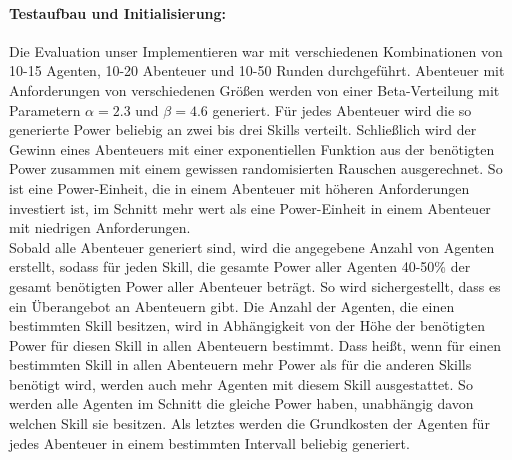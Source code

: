 \documentclass[fleqn,10pt]{SelfArx} %
\begin{document}
\paragraph{Testaufbau und Initialisierung:}
Die Evaluation unser Implementieren war mit verschiedenen Kombinationen von 10-15 Agenten, 10-20 Abenteuer und 10-50 Runden durchgeführt. Abenteuer mit Anforderungen von verschiedenen Größen werden von einer Beta-Verteilung mit Parametern $\alpha=2.3$ und $\beta=4.6$ generiert. Für jedes Abenteuer wird die so generierte Power beliebig an zwei bis drei Skills verteilt. Schließlich wird der Gewinn eines Abenteuers mit einer exponentiellen Funktion aus der benötigten Power zusammen mit einem gewissen randomisierten Rauschen ausgerechnet. So ist eine Power-Einheit, die in einem Abenteuer mit höheren Anforderungen investiert ist, im Schnitt mehr wert als eine Power-Einheit in einem Abenteuer mit niedrigen Anforderungen.\\
Sobald alle Abenteuer generiert sind, wird die angegebene Anzahl von Agenten erstellt, sodass für jeden Skill, die gesamte Power aller Agenten 40-50\% der gesamt benötigten Power aller Abenteuer beträgt. So wird sichergestellt, dass es ein Überangebot an Abenteuern gibt. Die Anzahl der Agenten, die einen bestimmten Skill besitzen, wird in Abhängigkeit von der Höhe der benötigten Power für diesen Skill in allen Abenteuern bestimmt. Dass heißt, wenn für einen bestimmten Skill in allen Abenteuern mehr Power als für die anderen Skills benötigt wird, werden auch mehr Agenten mit diesem Skill ausgestattet. So werden alle Agenten im Schnitt die gleiche Power haben, unabhängig davon welchen Skill sie besitzen. Als letztes werden die Grundkosten der Agenten für jedes Abenteuer in einem bestimmten Intervall beliebig generiert.
\end{document}
